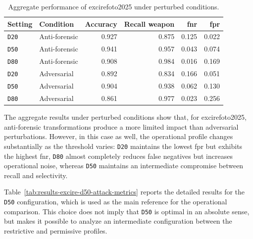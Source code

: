 \begin{table}[H]
\centering
\caption{Aggregate performance of \gls{excirefoto2025} under perturbed conditions.}
\label{tab:results-excire-perturbed-summary}
\small
\begin{tabular}{l l r r r r}
\toprule
\textbf{Setting} &
\textbf{Condition} &
\textbf{Accuracy} &
\textbf{Recall weapon} &
\textbf{\gls{fnr}} &
\textbf{\gls{fpr}} \\
\midrule

\texttt{D20} & Anti-forensic & 0.927 & 0.875 & 0.125 & 0.022 \\
\texttt{D50} & Anti-forensic & 0.941 & 0.957 & 0.043 & 0.074 \\
\texttt{D80} & Anti-forensic & 0.908 & 0.984 & 0.016 & 0.169 \\

\midrule

\texttt{D20} & Adversarial & 0.892 & 0.834 & 0.166 & 0.051 \\
\texttt{D50} & Adversarial & 0.904 & 0.938 & 0.062 & 0.130 \\
\texttt{D80} & Adversarial & 0.861 & 0.977 & 0.023 & 0.256 \\

\bottomrule
\end{tabular}
\end{table}

The aggregate results under perturbed conditions show that, for
\gls{excirefoto2025}, anti-forensic transformations produce a more limited
impact than adversarial perturbations. However, in this case as well, the
operational profile changes substantially as the threshold varies:
\texttt{D20} maintains the lowest \gls{fpr} but exhibits the highest \gls{fnr},
\texttt{D80} almost completely reduces false negatives but increases
operational noise, whereas \texttt{D50} maintains an intermediate compromise
between recall and selectivity.

Table~\ref{tab:results-excire-d50-attack-metrics} reports the detailed results
for the \texttt{D50} configuration, which is used as the main reference for the
operational comparison. This choice does not imply that \texttt{D50} is optimal
in an absolute sense, but makes it possible to analyze an intermediate
configuration between the restrictive and permissive profiles.

